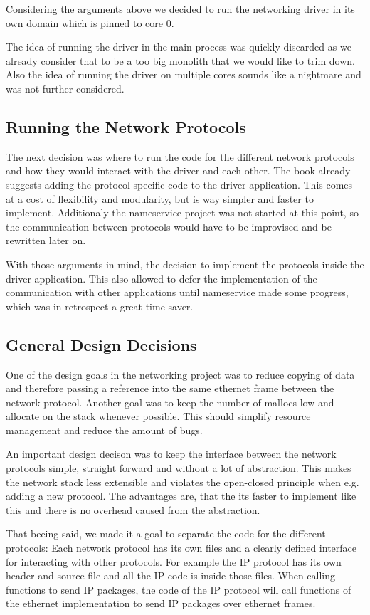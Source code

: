 Considering the arguments above we decided to run the networking driver in its own domain which is pinned to core 0.

The idea of running the driver in the main process was quickly discarded as we already consider that to be a too big monolith that we would like to trim down. Also the idea of running the driver on multiple cores sounds like a nightmare and was not further considered.

\subsection{Running the Network Protocols}

The next decision was where to run the code for the different network protocols and how they would interact with the driver and each other. The book already suggests adding the protocol specific code to the driver application. This comes at a cost of flexibility and modularity, but is way simpler and faster to implement. Additionaly the nameservice project was not started at this point, so the communication between protocols would have to be improvised and be rewritten later on.

With those arguments in mind, the decision to implement the protocols inside the driver application. This also allowed to defer the implementation of the communication with other applications until nameservice made some progress, which was in retrospect a great time saver.

\subsection{General Design Decisions}

One of the design goals in the networking project was to reduce copying of data and therefore passing a reference into the same ethernet frame between the network protocol. Another goal was to keep the number of mallocs low and allocate on the stack whenever possible. This should simplify resource management and reduce the amount of bugs.

An important design decison was to keep the interface between the network protocols simple, straight forward and without a lot of abstraction. This makes the network stack less extensible and violates the open-closed principle when e.g. adding a new protocol. The advantages are, that the its faster to implement like this and there is no overhead caused from the abstraction.

That beeing said, we made it a goal to separate the code for the different protocols: Each network protocol has its own files and a clearly defined interface for interacting with other protocols. For example the IP protocol has its own header and source file and all the IP code is inside those files. When calling functions to send IP packages, the code of the IP protocol will call functions of the ethernet implementation to send IP packages over ethernet frames.

